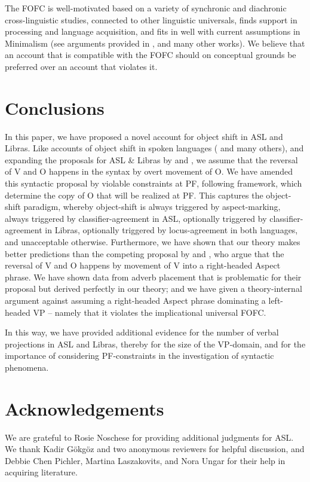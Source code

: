 \documentclass[output=paper]{langscibook}
\begin{document}
The FOFC is well-motivated based on a variety of synchronic
and diachronic cross-linguistic studies, connected to other linguistic
universals, finds support in processing and language acquisition, and
fits in well with current assumptions in Minimalism (see arguments
provided in \citealp{BiberauerHR.2014,SheehanBRH.2017}, and many other
works). We believe that an account that is compatible with the FOFC
should on conceptual grounds be preferred over an account that
violates it.

\section{Conclusions}
\label{lasz:sec:4}

In this paper, we have proposed a novel account for object shift in
ASL and Libras. Like accounts of object shift in spoken languages
(\citealp{Holmberg:1986} and many others), and expanding the proposals for
ASL \& Libras by \citet{Quadros.1999,Quadros.etal.2004,Quadros.DLM.2010} and \citet{Gokgoz.2013}, 
we assume that the reversal
of V and O happens in the syntax by overt movement of O. We have
amended this syntactic proposal by violable constraints at PF,
following  framework, which
determine the copy of O that will be realized at PF. This captures the
object-shift paradigm, whereby object-shift is always triggered by
aspect-marking, always triggered by classifier-agreement in ASL,
optionally triggered by classifier-agreement in Libras, optionally
triggered by locus-agreement in both languages, and unacceptable
otherwise. Furthermore, we have shown that our theory makes better
predictions than the competing proposal by 
\citet{Fischer.Janis.1992,Matsuoka.1997} and \citet{Braze.2004}, 
who argue that the reversal of V
and O happens by movement of V into a right-headed Aspect phrase.
We have shown data from adverb placement that is problematic for
their proposal but derived perfectly in our theory; and we have given a
theory-internal argument against assuming a right-headed Aspect
phrase dominating a left-headed VP -- namely that it violates the
implicational universal FOFC.

In this way, we have provided additional evidence for the
number of verbal projections in ASL and Libras, thereby for the size
of the VP-domain, and for the importance of considering
PF-constraints in the investigation of syntactic phenomena.

\section*{Acknowledgements}

We are grateful to Rosie Noschese for providing additional judgments
for ASL. We thank Kadir Gökgöz and two anonymous reviewers for
helpful discussion, and Debbie Chen Pichler, Martina Laszakovits, and
Nora Ungar for their help in acquiring literature. 

\printbibliography[heading=subbibliography,notkeyword=this]
\end{document}
